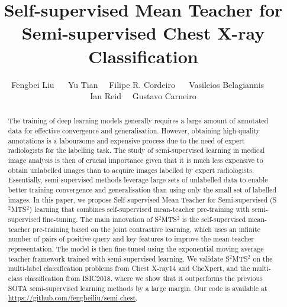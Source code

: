 \documentclass[runningheads]{llncs}
\newcommand\samethanks[1][\value{footnote}]{\footnotemark[#1]}
\begin{document}
\title{Self-supervised Mean Teacher for Semi-supervised Chest X-ray Classification }





\author{
Fengbei Liu  $\quad$
Yu Tian\inst{1,4\samethanks}$\quad$
Filipe R. Cordeiro $\quad$
Vasileios Belagiannis $\quad$ \\
Ian Reid$\quad$
Gustavo Carneiro
}



\maketitle              \vspace{-.3in}
\begin{abstract}

The training of deep learning models generally requires a large amount of annotated data for effective convergence and generalisation.
However, obtaining high-quality annotations is a laboursome and expensive process due to the need of expert radiologists for the labelling task.
The study of semi-supervised learning in medical image analysis is then of crucial importance given that it is much less expensive to obtain unlabelled images than to acquire images labelled by expert radiologists. Essentially, semi-supervised methods leverage large sets of unlabelled data to enable better training convergence and generalisation than using only the small set of labelled images. In this paper, we propose Self-supervised Mean Teacher for Semi-supervised (S$^2$MTS$^2$) learning that combines self-supervised mean-teacher pre-training with semi-supervised fine-tuning. The main innovation of S$^2$MTS$^2$ is the self-supervised mean-teacher pre-training based on the joint contrastive learning, which uses an infinite number of pairs of positive query and key features to improve the mean-teacher representation. The model is then fine-tuned using the exponential moving average teacher framework trained with semi-supervised learning. We validate S$^2$MTS$^2$ on the multi-label classification problems from Chest X-ray14 and CheXpert, and the multi-class classification from ISIC2018, where we show that it outperforms the previous SOTA semi-supervised learning methods by a large margin. Our code is available at \url{https://github.com/fengbeiliu/semi-chest}. 

\end{abstract}
\vspace{-.3in}
\end{document}
